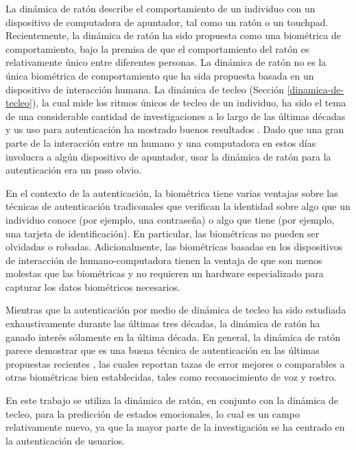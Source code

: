 La dinámica de ratón describe el comportamiento de un individuo con un
dispositivo de computadora de apuntador, tal como un ratón o un
touchpad. Recientemente, la dinámica de ratón ha sido propuesta como
una biométrica de comportamiento, bajo la premisa de que el
comportamiento del ratón es relativamente único entre diferentes
personas. La dinámica de ratón no es la única biométrica de
comportamiento que ha sida propuesta basada en un dispositivo de
interacción humana. La dinámica de tecleo (Sección
\ref{dinamica-de-tecleo}), la cual mide los ritmos únicos de tecleo de
un individuo, ha sido el tema de una considerable cantidad de
investigaciones a lo largo de las últimas décadas y us uso para
autenticación ha mostrado buenos resultados
\cite{monrose2000keystroke}. Dado que una gran parte de la interacción
entre un humano y una computadora en estos días involucra a algún
dispositivo de apuntador, usar la dinámica de ratón para la
autenticación era un paso obvio.

En el contexto de la autenticación, la biométrica tiene varias
ventajas sobre las técnicas de autenticación tradiconales que
verifican la identidad sobre algo que un individuo conoce (por
ejemplo, una contraseña) o algo que tiene (por ejemplo, una tarjeta de
identificación). En particular, las biométricas no pueden ser
olvidadas o robadas. Adicionalmente, las biométricas basadas en los
dispositivos de interacción de humano-computadora tienen la ventaja de
que son menos molestas que las biométricas y no requieren un hardware
especializado para capturar los datos biométricos necesarios.

Mientras que la autenticación por medio de dinámica de tecleo ha sido
estudiada exhaustivamente durante las últimas tres décadas, la
dinámica de ratón ha ganado interés sólamente en la última década. En
general, la dinámica de ratón parece demostrar que es una buena
técnica de autenticación en las últimas propuestas recientes
\cite{ahmed2007new} \cite{gamboa2004behavioral}, las cuales reportan
tazas de error mejores o comparables a otras biométricas bien
establecidas, tales como reconocimiento de voz y rostro.

En este trabajo se utiliza la dinámica de ratón, en conjunto con la
dinámica de tecleo, para la predicción de estados emocionales, lo cual
es un campo relativamente nuevo, ya que la mayor parte de la
investigación se ha centrado en la autenticación de usuarios.